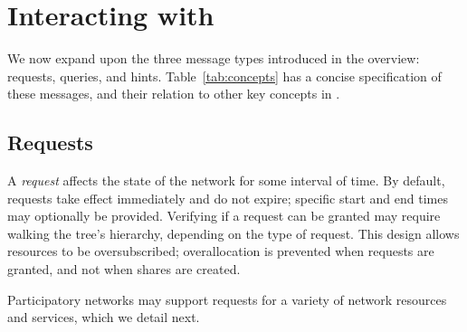 
\chapter{Interacting with \sys}
\label{sec:messages}

We now expand upon the three message types introduced
in the overview: requests, queries, and hints. Table~\ref{tab:concepts}
has a concise specification of these messages, and their
relation to other key concepts in \sys.

%

\section{Requests}
\label{sec:Requests}

A \emph{request} affects the state of the network for some interval of time. 
%
By default, requests take effect immediately and do not expire;
specific start and end times may optionally be provided.  Verifying if
a request can be granted may require walking the tree's hierarchy,
depending on the type of request.  This design allows resources to be
oversubscribed; overallocation is prevented when requests are granted,
and not when shares are created.

Participatory networks may support requests for a variety of network
resources and services, which we detail next.

